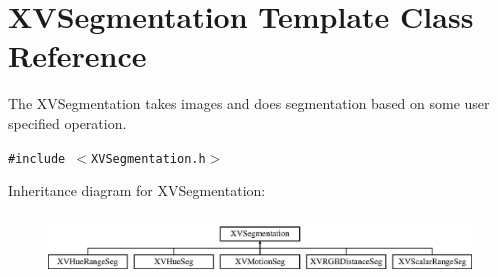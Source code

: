 \hypertarget{class_XVSegmentation}{
\section{XVSegmentation  Template Class Reference}
\label{XVSegmentation}
}
The XVSegmentation takes images and does segmentation based on some user specified operation. 


{\tt \#include $<$XVSegmentation.h$>$}

Inheritance diagram for XVSegmentation:\begin{figure}[H]
\begin{center}
\leavevmode
\includegraphics[height=1.67164cm]{class_XVSegmentation}
\end{center}
\end{figure}
